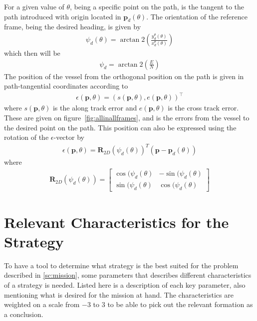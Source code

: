 For a given value of $\theta$, being a specific point on the path, is the tangent to the path introduced with origin located in $\textbf{p}_d(\theta)$. The orientation of the reference frame, being the desired heading, is given by
\begin{align}
\psi_d(\theta) = \arctan2\left(\frac{y_d^\theta(\theta)}{x_d^\theta(\theta)}\right)
\end{align}
which then will be
\begin{align}
\psi_d = \arctan2\left(\frac{E}{N}\right)
\end{align}
The position of the vessel from the orthogonal position on the path is given in path-tangential coordinates according to
\begin{align}
\epsilon(\textbf{p},\theta) = (s(\textbf{p},\theta),e(\textbf{p},\theta))^\top
\end{align}
where $s(\textbf{p},\theta)$ is the along track error and $e(\textbf{p},\theta)$ is the cross track error. These are given on figure~\vref{fig:allinallframes}, and is the errors from the vessel to the desired point on the path. This position can also be expressed using the rotation of the $\epsilon$-vector by
\begin{align}
\epsilon(\textbf{p},\theta) = \textbf{R}_{2D}(\psi_d(\theta))^T(\textbf{p}-\textbf{p}_d(\theta))
\end{align}
where
\begin{align}
\textbf{R}_{2D}(\psi_d(\theta)) = 
\begin{bmatrix}
\cos(\psi_d(\theta) & -\sin(\psi_d(\theta)\\
\sin(\psi_d(\theta) & \cos(\psi_d(\theta)
\end{bmatrix}
\end{align}

\section{Relevant Characteristics for the Strategy}
To have a tool to determine what strategy is the best suited for the
problem described in \vref{sc:mission}, some parameters that describes
different characteristics of a strategy is needed. Listed here is a
description of each key parameter, also mentioning what is desired for
the mission at hand. The characteristics are weighted on a scale from $-3$ to $3$ to be able to pick out the relevant formation as a conclusion.

